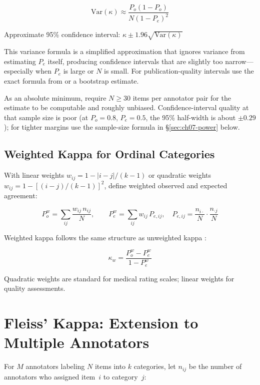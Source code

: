\[
\text{Var}(\kappa) \approx \frac{P_o(1-P_o)}{N(1-P_e)^2}
\]

Approximate 95\% confidence interval: $\kappa \pm 1.96\sqrt{\text{Var}(\kappa)}$

\begin{cautionbox}
This variance formula is a simplified approximation that ignores variance from estimating $P_e$ itself, producing confidence intervals that are slightly too narrow---especially when $P_e$ is large or $N$ is small. For publication-quality intervals use the exact formula from \textcite{fleiss1971measuring} or a bootstrap estimate.
\end{cautionbox}

As an absolute minimum, require $N \geq 30$ items per annotator pair for the estimate to be computable and roughly unbiased. Confidence-interval quality at that sample size is poor (at $P_o = 0.8$, $P_e = 0.5$, the 95\% half-width is about $\pm 0.29$); for tighter margins use the sample-size formula in \S\ref{sec:ch07-power} below.

\subsection{Weighted Kappa for Ordinal Categories}

With linear weights $w_{ij} = 1 - |i-j|/(k-1)$ or quadratic weights $w_{ij} = 1 - [(i-j)/(k-1)]^2$, define weighted observed and expected agreement:

\[
P_o^w = \sum_{ij} \frac{w_{ij}\, n_{ij}}{N}, \qquad P_e^w = \sum_{ij} w_{ij}\, P_{e,ij},
\quad P_{e,ij} = \frac{n_{i\cdot}}{N} \cdot \frac{n_{\cdot j}}{N}
\]

Weighted kappa follows the same structure as unweighted kappa \autocite{cohen1968weighted}:

\[
\kappa_w = \frac{P_o^w - P_e^w}{1 - P_e^w}
\]

Quadratic weights are standard for medical rating scales; linear weights for quality assessments.

\section{Fleiss' Kappa: Extension to Multiple Annotators}

For $M$ annotators labeling $N$ items into $k$ categories, let $n_{ij}$ be the number of annotators who assigned item~$i$ to category~$j$:

